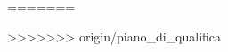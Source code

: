 


\newcommand{\sethdr}[1]{
		\pagestyle{fancy}
		\lhead{\texttt{[image: Swellfish\_logo.png]}}	
		\rhead{#1}
}



=======
\newcommand{\sethdr}[1]{
		\pagestyle{fancy}
		\lhead{\texttt{[image: Swellfish\_logo.png]}}	
		\rhead{#1}
}




>>>>>>> origin/piano_di_qualifica
